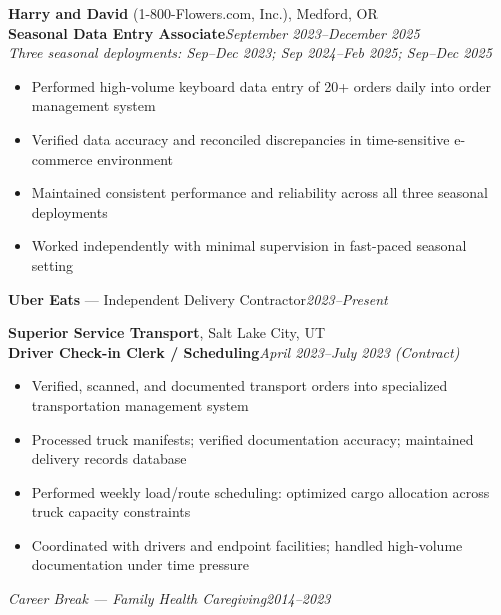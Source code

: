 \documentclass[9pt,letterpaper]{extarticle}
\begin{document}
\noindent\textbf{Harry and David} (1-800-Flowers.com, Inc.), Medford, OR\\
\textbf{Seasonal Data Entry Associate}\hfill\textit{September 2023--December 2025}\\
\textit{Three seasonal deployments: Sep--Dec 2023; Sep 2024--Feb 2025; Sep--Dec 2025}
\begin{itemize}
  \item Performed high-volume keyboard data entry of 20+ orders daily into order management system
  \item Verified data accuracy and reconciled discrepancies in time-sensitive e-commerce environment
  \item Maintained consistent performance and reliability across all three seasonal deployments
  \item Worked independently with minimal supervision in fast-paced seasonal setting
\end{itemize}

\vspace{3pt}
\noindent\textbf{Uber Eats} --- Independent Delivery Contractor\hfill\textit{2023--Present}

\vspace{5pt}
\noindent\textbf{Superior Service Transport}, Salt Lake City, UT\\
\textbf{Driver Check-in Clerk / Scheduling}\hfill\textit{April 2023--July 2023 (Contract)}
\begin{itemize}
  \item Verified, scanned, and documented transport orders into specialized transportation management system
  \item Processed truck manifests; verified documentation accuracy; maintained delivery records database
  \item Performed weekly load/route scheduling: optimized cargo allocation across truck capacity constraints
  \item Coordinated with drivers and endpoint facilities; handled high-volume documentation under time pressure
\end{itemize}

\vspace{3pt}
\noindent\textit{Career Break --- Family Health Caregiving}\hfill\textit{2014--2023}
\end{document}
